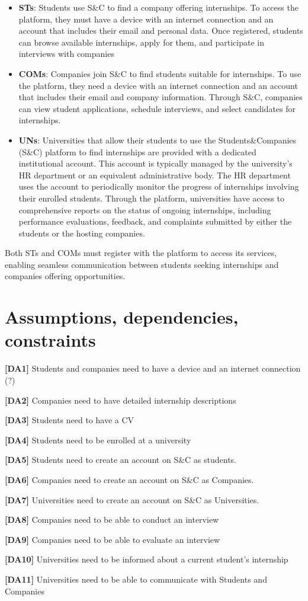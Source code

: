 \begin{itemize}
    \item \textbf{STs}: Students use S\&C to find a company offering internships. To access the platform, they must have a device with an internet connection and an account that includes their email and personal data. Once registered, students can browse available internships, apply for them, and participate in interviews with 
    companies

    \item \textbf{COMs}:  Companies join S\&C to find students suitable for internships. To use the platform, they need a device with an internet connection and an account that includes their email and company information. Through S\&C, companies can view student applications, schedule interviews, and select candidates for internships.

    \item \textbf{UNs}: Universities that allow their students to use the Students\&Companies (S\&C) platform to find internships are provided with a dedicated institutional account. This account is typically managed by the university’s HR department or an equivalent administrative body.
    The HR department uses the account to periodically monitor the progress of internships involving their enrolled students. Through the platform, universities have access to comprehensive reports on the status of ongoing internships, including performance evaluations, feedback, and complaints submitted by either the students or the hosting companies.
    
\end{itemize}

Both STs and COMs must register with the platform to access its services, enabling seamless communication between students seeking internships and companies offering opportunities.

\section{Assumptions, dependencies, constraints}
\textbf{[DA1] }Students and companies need to have a device and an internet connection (?)

\textbf{[DA2]} Companies need to have detailed internship descriptions

\textbf{[DA3]} Students need to have a CV

\textbf{[DA4]} Students need to be enrolled at a university 

\textbf{[DA5]} Students need to create an account on S\&C as students.

\textbf{[DA6]} Companies need to create an account on S\&C as Companies.

\textbf{[DA7]} Universities need to create an account on S\&C as Universities.

\textbf{[DA8]} Companies need to be able to conduct an interview

\textbf{[DA9]} Companies need to be able to evaluate an interview

\textbf{[DA10]} Universities need to be informed about a current student's internship

\textbf{[DA11]} Universities need to be able to communicate with Students and Companies
